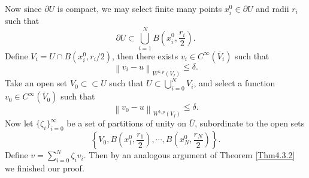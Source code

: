 Now since $\partial U$ is compact, we may select finite many points $x^0_i\in\partial U$ and radii $r_i$ such that 
$$
\partial U\subset \bigcup_{i=1}^N{B\left( x_{i}^{0},\frac{r_i}{2} \right)}.
$$
Define $V_i=U\cap B(x_i^0,r_i/2)$, then there exists $v_i\in C^\infty(\overline{V}_i)$ such that 
$$
\left\| v_i-u \right\| _{W^{k,p}\left( V_I \right)}\le \delta .
$$
Take an open set $V_0\subset\subset U$ such that $U\subset\bigcup_{i=0}^NV_i$, and select a function $v_0\in C^\infty(\overline{V}_0)$ such that 
$$
\left\| v_0-u \right\| _{W^{k,p}\left( V_I \right)}\le \delta .
$$
Now let $\{\zeta_i\}_{i=0}^\infty$ be a set of partitions of unity on $\overline{U}$, subordinate to the open sets 
$$
\left\{ V_0,B\left( x_{1}^{0},\frac{r_1}{2} \right) ,\cdots ,B\left( x_{N}^{0},\frac{r_N}{2} \right) \right\} .
$$
Define $v=\sum_{i=0}^N\zeta_iv_i$. Then by an analogous argument of Theorem \ref{Thm4.3.2} we finished our proof.
